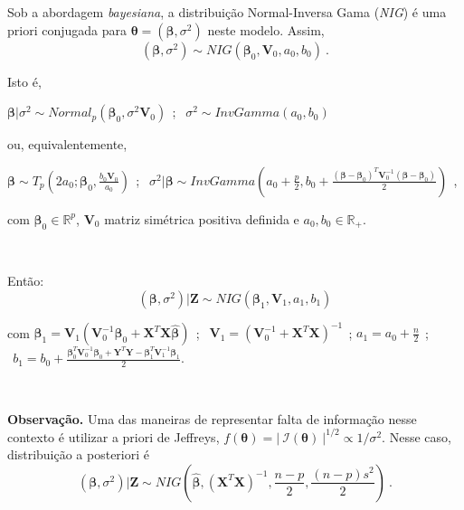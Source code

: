 \documentclass[
]{book}
\begin{document}
\(~\)

\(~\)

Sob a abordagem \emph{bayesiana}, a distribuição Normal-Inversa Gama (\emph{NIG}) é uma priori conjugada para \(\boldsymbol{\theta} = (\boldsymbol{\beta},\sigma^2)\) neste modelo. Assim,
\[(\boldsymbol{\beta},\sigma^2) \sim \textit{NIG}(\boldsymbol{\beta}_0, \boldsymbol{V}_0, a_0, b_0)~.\]

Isto é,

\(\boldsymbol{\beta} | \sigma^2 \sim Normal_p\left(\boldsymbol{\beta}_0,\sigma^2\boldsymbol{V}_0\right)~~\); \(~~ \sigma^2 \sim InvGamma\left(a_0,b_0\right)\)

ou, equivalentemente,

\(\boldsymbol{\beta} \sim T_p\left(2a_0; \boldsymbol{\beta}_0,\frac{b_0 \boldsymbol{V}_0}{a_0}\right) ~~\); \(~~ \sigma^2 | \boldsymbol{\beta} \sim InvGamma\left(a_0 + \frac{p}{2},b_0 + \frac{\left(\boldsymbol{\beta}-\boldsymbol{\beta}_0\right)^T \boldsymbol{V}_0^{-1} \left(\boldsymbol{\beta}-\boldsymbol{\beta}_0\right) }{2}\right)~~\),

com \(\boldsymbol{\beta}_0 \in \mathbb{R}^p\), \(\boldsymbol{V}_0\) matriz simétrica positiva definida e \(a_0, b_0 \in \mathbb{R}_+\).

\(~\)

Então:
\[(\boldsymbol{\beta},\sigma^2)|\boldsymbol{Z} \sim \textit{NIG}(\boldsymbol{\beta}_1, \boldsymbol{V}_1, a_1, b_1)\]

com
\(\boldsymbol{\beta}_1 = \boldsymbol{V}_1\left(\boldsymbol{V}_0^{-1}\boldsymbol{\beta}_0 + \boldsymbol{X}^T\boldsymbol{X} \hat{\boldsymbol{\beta}}\right) ~~\); \(~~ \boldsymbol{V}_1 = \left(\boldsymbol{V}_0^{-1} + \boldsymbol{X}^T\boldsymbol{X}\right)^{-1}~~\);
\(a_1 = a_0+\frac{n}{2} ~~\); \(~~ b_1 = b_0 + \frac{\boldsymbol{\beta}_0^T\boldsymbol{V}_0^{-1}\boldsymbol{\beta}_0 + \boldsymbol{Y}^T\boldsymbol{Y} - \boldsymbol{\beta}_1^T\boldsymbol{V}_1^{-1}\boldsymbol{\beta}_1}{2}\).

\(~\)

\textbf{Observação.} Uma das maneiras de representar falta de informação nesse contexto é utilizar a priori de Jeffreys, \(f(\boldsymbol \theta) = \Big|~\mathcal{I}(\boldsymbol \theta)~\Big|^{1/2} \propto 1/\sigma^2\). Nesse caso, distribuição a posteriori é \[(\boldsymbol{\beta},\sigma^2)\Big|\boldsymbol{Z} \sim \textit{NIG}\left(\hat{\boldsymbol{\beta}}, \left(\boldsymbol{X}^T\boldsymbol{X}\right)^{-1}, \dfrac{n-p}{2}, \dfrac{(n-p)s^2}{2}\right)~.\]

\(~\)
\end{document}
